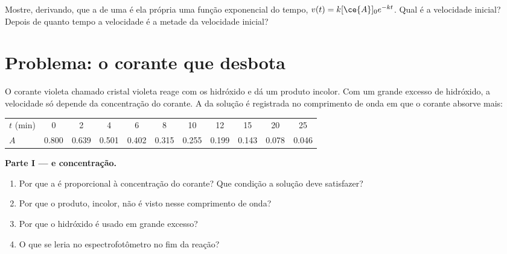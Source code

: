\begin{exercise}[$\star\star\star$]\label{exo:g12:reaction-rates:15}
Mostre, derivando, que a  de uma  é ela própria uma função exponencial do tempo,
$v(t) = k[\ce{A}]_0 e^{-kt}$. Qual é a velocidade inicial? Depois de
quanto tempo a velocidade é a metade da velocidade inicial?
\end{exercise}

\section{Problema: o corante que desbota}

\begin{problem}
\label{pb:g12:reaction-rates:1}
O corante violeta chamado cristal violeta reage com os  hidróxido e
dá um produto incolor. Com um grande excesso de hidróxido, a velocidade
só depende da concentração do corante. A  da solução é
registrada no comprimento de onda em que o corante absorve mais:
\begin{center}
\small
\begin{tabular}{l*{10}{c}}
\hline
$t$ (\si{min}) & 0 & 2 & 4 & 6 & 8 & 10 & 12 & 15 & 20 & 25 \\
$A$ & 0.800 & 0.639 & 0.501 & 0.402 & 0.315 & 0.255 & 0.199 & 0.143 &
0.078 & 0.046 \\
\hline
\end{tabular}
\end{center}

\medskip
\noindent\textbf{Parte I ---  e concentração.}
\begin{enumerate}
  \item Por que a  é proporcional à concentração do corante?
        Que condição a solução deve satisfazer?
  \item Por que o produto, incolor, não é visto nesse comprimento de
        onda?
  \item Por que o hidróxido é usado em grande excesso?
  \item O que se leria no espectrofotômetro no fim da reação?
\end{enumerate}


\end{problem}
